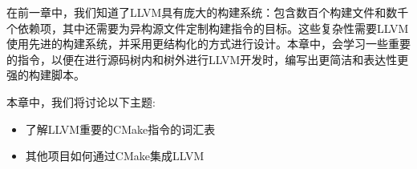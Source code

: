 
在前一章中，我们知道了LLVM具有庞大的构建系统：包含数百个构建文件和数千个依赖项，其中还需要为异构源文件定制构建指令的目标。这些复杂性需要LLVM使用先进的构建系统，并采用更结构化的方式进行设计。本章中，会学习一些重要的指令，以便在进行源码树内和树外进行LLVM开发时，编写出更简洁和表达性更强的构建脚本。

本章中，我们将讨论以下主题:

\begin{itemize}
\item 了解LLVM重要的CMake指令的词汇表
\item 其他项目如何通过CMake集成LLVM
\end{itemize}
